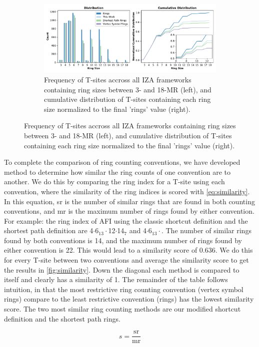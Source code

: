 \documentclass[preprint,numrefs,noinfo,sort&compress]{elsarticle}
\begin{document}
\begin{figure}
\begin{figure}[H]
\centering
\includegraphics[width=\textwidth]{figures/chapter-3/dist-cumudist.pdf}
\caption{Frequency of T-sites accross all IZA frameworks containing ring sizes between 3- and 18-MR (left), and cumulative distribution of T-sites containing each ring size normalized to the final 'rings' value (right). \label{fig:tsite-frequency}}
\end{figure}
\end{figure}

To complete the comparison of ring counting conventions, we have developed method to determine how similar the ring counts of one convention are to another. We do this by comparing the ring index for a T-site using each convention, where the similarity of the ring indices is scored with \cref{eq:similarity}. In this equation, sr is the number of similar rings that are found in both counting conventions, and mr is the maximum number of rings found by either convention. For example: the ring index of AFI using the classic shortcut definition and the shortest path definition are 4\(\cdot\)6\(_{\text{13}} \cdot\)12\(\cdot\)14\(_{\text{7}}\) and 4\(\cdot\)6\(_{\text{13}} \cdot\). The number of similar rings found by both conventions is 14, and the maximum number of rings found by either convention is 22. This would lead to a similarity score of 0.636. We do this for every T-site between two conventions and average the similarity score to get the results in \cref{fig:similarity}. Down the diagonal each method is compared to itself and clearly has a similarity of 1. The remainder of the table follows intuition, in that the  most restrictive ring counting convention (vertex symbol rings) compare to the least restrictive convention (rings) has the lowest similarity score. The two most similar ring counting methods are our modified shortcut definition and the shortest path rings. 

\begin{equation}\label{eq:similarity}
s = \mathrm{ \frac{sr}{mr} }
\end{equation}
\end{document}
